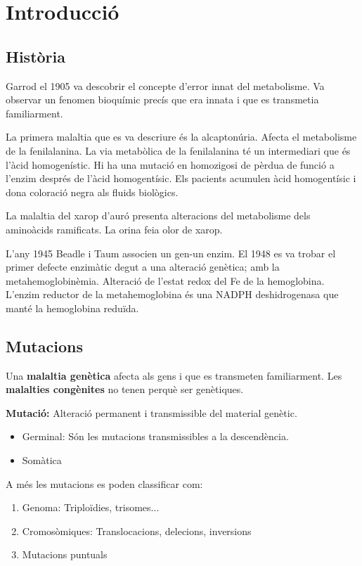 \section{Introducció}
\subsection{Història}
Garrod el 1905 va descobrir el concepte d'error innat del metabolisme. Va observar un fenomen bioquímic precís que era innata i que es transmetia familiarment.

La primera malaltia que es va descriure és la alcaptonúria. Afecta el metabolisme de la fenilalanina. La via metabòlica de la fenilalanina té un intermediari que és l'àcid homogenístic. Hi ha una mutació en homozigosi de pèrdua de funció a l'enzim després de l'àcid homogentísic. Els pacients acumulen àcid homogentísic i dona coloració negra als fluids biològics.

La malaltia del xarop d'auró presenta alteracions del metabolisme dels aminoàcids ramificats. La orina feia olor de xarop.

L'any 1945 Beadle i Taum associen un gen-un enzim. El 1948 es va trobar el primer defecte enzimàtic degut a una alteració genètica; amb la metahemoglobinèmia. Alteració de l'estat redox del Fe de la hemoglobina. L'enzim reductor de la metahemoglobina és una NADPH deshidrogenasa que manté la hemoglobina reduïda.

\subsection{Mutacions}
Una \textbf{malaltia genètica} afecta als gens i que es transmeten familiarment. Les \textbf{malalties congènites} no tenen perquè ser genètiques. 

\textbf{Mutació:} Alteració permanent i transmissible del material genètic.
  \begin{itemize}
  \item Germinal: Són les mutacions transmissibles a la descendència.
  \item Somàtica
  \end{itemize}

A més les mutacions es poden classificar com:
\begin{enumerate}
\item Genoma: Triploïdies, trisomes...
\item Cromosòmiques: Translocacions, delecions, inversions
\item Mutacions puntuals
\end{enumerate}

